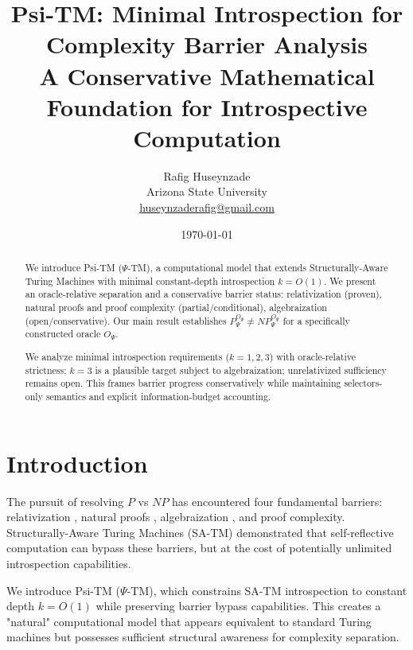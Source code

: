 \documentclass[11pt]{article}
\title{Psi-TM: Minimal Introspection for Complexity Barrier Analysis\\
\large{A Conservative Mathematical Foundation for Introspective Computation}}
\author{Rafig Huseynzade\\
Arizona State University\\
\href{mailto:huseynzaderafig@gmail.com}{huseynzaderafig@gmail.com}}
\date{\today}
\theoremstyle{plain}
\theoremstyle{definition}
\begin{document}
\maketitle

\begin{abstract}
We introduce Psi-TM ($\Psi$-TM), a computational model that extends Structurally-Aware Turing Machines with minimal constant-depth introspection $k = O(1)$. We present an oracle-relative separation and a conservative barrier status: relativization (proven), natural proofs and proof complexity (partial/conditional), algebraization (open/conservative). Our main result establishes $P^{O_\Psi}_\Psi \neq NP^{O_\Psi}_\Psi$ for a specifically constructed oracle $O_\Psi$.

We analyze minimal introspection requirements ($k=1,2,3$) with oracle-relative strictness; $k=3$ is a plausible target subject to algebraization; unrelativized sufficiency remains open. This frames barrier progress conservatively while maintaining selectors-only semantics and explicit information-budget accounting.
\end{abstract}

\tableofcontents
\newpage







\section{Introduction}

The pursuit of resolving $P$ vs $NP$ has encountered four fundamental barriers: relativization \cite{BGS75}, natural proofs \cite{RR97}, algebraization \cite{AW09}, and proof complexity. Structurally-Aware Turing Machines (SA-TM) \cite{SA-TM} demonstrated that self-reflective computation can bypass these barriers, but at the cost of potentially unlimited introspection capabilities.

We introduce Psi-TM ($\Psi$-TM), which constrains SA-TM introspection to constant depth $k = O(1)$ while preserving barrier bypass capabilities. This creates a "natural" computational model that appears equivalent to standard Turing machines but possesses sufficient structural awareness for complexity separation.
\end{document}
